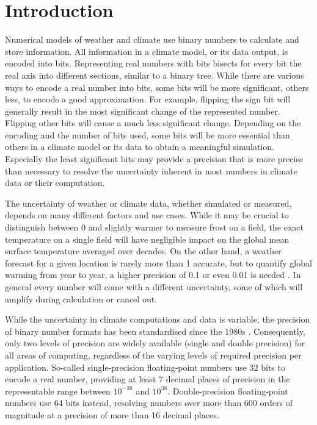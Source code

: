 \chapter{Introduction}
\label{chap:introduction}

Numerical models of weather and climate use binary numbers to calculate and store information.
All information in a climate model, or its data output, is encoded into bits. Representing
real numbers with bits bisects for every bit the real axis into different sections, similar to a binary tree.
While there are various ways to encode a real number into bits, some bits will be more significant, others
less, to encode a good approximation. For example, flipping the sign bit will
generally result in the most significant change of the represented number. Flipping other bits will
cause a much less significant change. Depending on the encoding and the number of bits used,
some bits will be more essential than others in a climate model or its data to obtain a meaningful
simulation. Especially the least significant bits may provide a precision that is more precise than
necessary to resolve the uncertainty inherent in most numbers in climate data or their computation.

The uncertainty of weather or climate data, whether simulated or measured, depends on many different
factors and use cases. While it may be crucial to distinguish between 0 and slightly warmer
to measure frost on a field, the exact temperature on a single field will have negligible impact on the
global mean surface temperature averaged over decades. On the other hand, a weather forecast for a
given location is rarely more than 1 accurate, but to quantify global warming from year to year,
a higher precision of 0.1 or even 0.01 is needed \citep{Haustein2017}. In general
every number will come with a different uncertainty, some of which will amplify during calculation or cancel out.

While the uncertainty in climate computations and data is variable, the precision of binary number formats
has been standardised since the 1980s \citep{IEEE1985,IEEE2008}. Consequently, only two levels of precision
are widely available (single and double precision) for all areas of computing, regardless of the varying levels of
required precision per application. So-called single-precision floating-point numbers use 32 bits to encode a
real number, providing at least 7 decimal places of precision in the representable range between $10^{-38}$
and $10^{38}$. Double-precision floating-point numbers use 64 bits instead, resolving numbers over more
than 600 orders of magnitude at a precision of more than 16 decimal places. 

